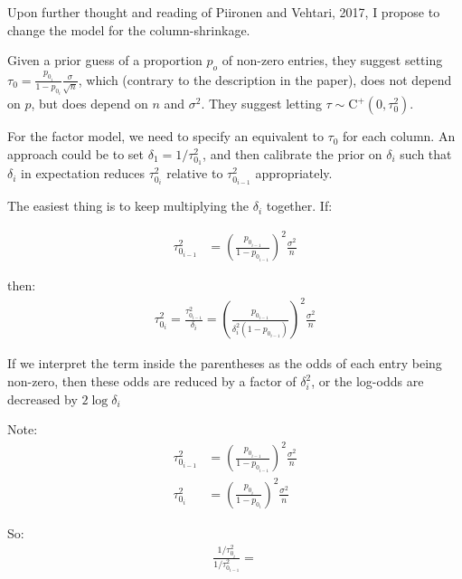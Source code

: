 \documentclass[11pt]{amsart}
\begin{document}
Upon further thought and reading of Piironen and Vehtari, 2017, I propose to change the model for the column-shrinkage.

Given a prior guess of a proportion $p_o$ of non-zero entries, they suggest setting $\tau_0 = \frac{p_{0_i}}{1-p_{0_i}}\frac{\sigma}{\sqrt{n}}$, which (contrary
to the description in the paper), does not depend on $p$, but does depend on $n$ and $\sigma^2$. They suggest letting $\tau \sim \mbox{C}^+(0,\tau^2_0)$.

For the factor model, we need to specify an equivalent to $\tau_0$ for each column. An approach could be to set $\delta_1 = 1/\tau^2_{0_1}$, and then calibrate 
the prior on $\delta_i$ such that $\delta_i$ in expectation reduces $\tau^2_{0_i}$ relative to $\tau^2_{0_{i-1}}$ appropriately.

The easiest thing is to keep multiplying the $\delta_i$ together.  If:


\begin{align*}
\tau^2_{0_{i-1}} &= \left(\frac{p_{0_{i-1}}}{1-p_{0_{i-1}}}\right)^2\frac{\sigma^2}{n} 
\end{align*}

\noindent then:
\begin{align*}
\tau^2_{0_{i}} = \frac{\tau^2_{0_{i-1}} }{\delta_i} = \left(\frac{p_{0_{i-1}}}{\delta^2_i(1-p_{0_{i-1}})}\right)^2\frac{\sigma^2}{n} 
\end{align*}

If we interpret the term inside the parentheses as the odds of each entry being non-zero, then these odds are reduced by a factor of $\delta^2_i$, or the log-odds are decreased by $2 \log\delta_i$






Note:
\begin{align*}
\tau^2_{0_{i-1}} &= \left(\frac{p_{0_{i-1}}}{1-p_{0_{i-1}}}\right)^2\frac{\sigma^2}{n} \\
\tau^2_{0_{i}} &= \left(\frac{p_{0_{i}}}{1-p_{0_{i}}}\right)^2\frac{\sigma^2}{n} 
\end{align*}

So:
\begin{align*}
\frac{1/\tau^2_{0_{i}}}{1/\tau^2_{0_{i-1}}} = 
\end{align*}
\end{document}
